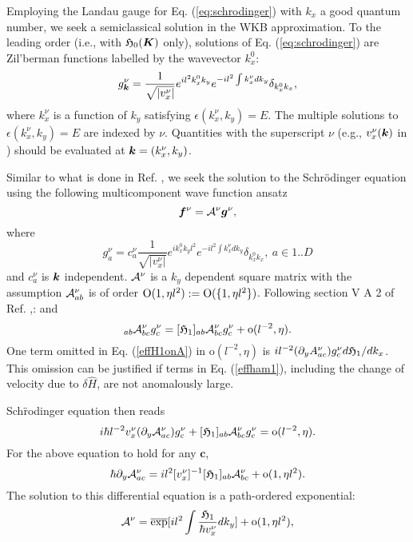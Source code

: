 \begin{appendices}
Employing the Landau gauge for Eq. (\ref{eq:schrodinger}) with $k_x$ a good quantum number, we seek a semiclassical solution in the WKB approximation. To the leading order (i.e., with $\mathfrak{H}_0(\boldsymbol{K})$ only), solutions of Eq. (\ref{eq:schrodinger}) are Zil'berman functions\cite{zilberman} labelled by the wavevector $k_x^0$:
\begin{equation}
g_{\bk}^\nu=\frac{1}{\sqrt{|v_x^\nu|}}e^{il^2k_x^0k_y}e^{-il^{2}\int k_x^\nu dk_y}\delta_{k_x^0 k_x},\la{zilberman}
\end{equation}
where $k_x^\nu$ is a function of $k_y$ satisfying   $\epsilon(k_x^\nu,k_y)=E$. The multiple solutions to $\epsilon(k_x^\nu,k_y)=E$ are indexed by $\nu$. Quantities   with the superscript $\nu$ (e.g., $v_x^\nu(\boldsymbol{k})$ in ) should be evaluated at  $\boldsymbol{k} = (k_x^\nu, k_y)$.

Similar to what is done in Ref. , we seek the solution to the Schr\"odinger equation using the following multicomponent wave function ansatz
\begin{equation}
\boldsymbol{f}^\nu={\cal A}^\nu\boldsymbol{g}^\nu,\label{wkb-wf}
\end{equation}
where 
\begin{equation}
g_a^\nu=c_{a}^\nu\frac{1}{\sqrt{|v_x^\nu|}}e^{ik^{0}_{x}k_{y}l^{2}}e^{-il^{2}\int k_{x}^\nu dk_{y}}\delta_{k^{0}_{x}k_{x}},~a\in{1..D}
\end{equation}
and $c_a^\nu$ is $\boldsymbol{k}$ independent. ${\cal A}^\nu$ is a $k_y$ dependent square matrix with the assumption ${\cal A}_{ab}^\nu$ is of order $\text{O}(1, \eta l^2):=\text{O}(\{1,\eta l^2\})$. Following section V A 2 of Ref. ,:
and
\begin{equation}
[\effH_{1}(\bK)]_{ab}\A_{bc}^\nu g_{c}^\nu=[\effH_{1}]_{ab}\A_{bc}^\nu g_{c}^\nu+\text{o}(l^{-2}, \eta).\label{effH1onA}
\end{equation}
One term omitted in Eq. (\ref{effH1onA}) in $\text{o}(l^{-2},\eta)$ is $i l^{-2}(\partial_{y}A_{ac}^\nu)g_{c}^\nu d\mathfrak{H}_1/dk_x$. This omission can be justified if terms in Eq. ({\ref{effham1}}), including the change of velocity due to $\delta\hat{H}$, are not anomalously large.

Sch\"rodinger equation then reads 
\begin{equation}
i\hbar l^{-2} v_{x}^\nu (\partial_{y}{\cal A}_{ac}^\nu)  g_{c}^\nu+[\mathfrak{H}_{1}]_{ab}{\cal A}_{bc}^\nu g_{c}^\nu=\text{o}(l^{-2}, \eta).
\end{equation}
For the above equation to hold for any $\mathbf{c}$,
\begin{equation}
\hbar\partial_{y}{\cal A}_{ac}^\nu=il^{2}[v_{x}^\nu]^{-1}[\mathfrak{H}_{1}]_{ab}{\cal A}_{bc}^\nu+{\text{o}(1, \eta l^2)}.
\end{equation}
The solution to this differential equation is a path-ordered exponential:
\begin{equation}
{\cal A}^\nu=\overline{\exp}[il^{2}\int\frac{\mathfrak{H}_{1}}{\hbar v_{x}^\nu}dk_{y}]+{\text{o}(1, \eta l^2)},
\end{equation}


\end{appendices}
